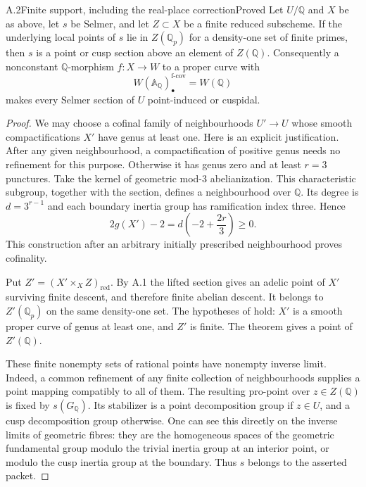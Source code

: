 \begin{statement}{A.2}{Finite support, including the real-place correction}{Proved}
Let $U/\mathbb Q$ and $X$ be as above, let $s$ be Selmer, and let
$Z\subset X$ be a finite reduced subscheme. If the underlying local points
of $s$ lie in $Z(\mathbb Q_p)$ for a density-one set of finite primes, then
$s$ is a point or cusp section above an element of $Z(\mathbb Q)$.
Consequently a nonconstant $\mathbb Q$-morphism $f:X\to W$ to a proper curve
with
\[
 W(\mathbb A_{\mathbb Q})_\bullet^{\mathrm{f\text{-}cov}}=W(\mathbb Q)
\]
makes every Selmer section of $U$ point-induced or cuspidal.
\end{statement}
\begin{proof}
We may choose a cofinal family of neighbourhoods $U'\to U$ whose smooth
compactifications $X'$ have genus at least one. Here is an explicit
justification. After any given neighbourhood, a compactification of positive
genus needs no refinement for this purpose. Otherwise it has genus zero
and at least $r=3$ punctures. Take the kernel of geometric mod-$3$
abelianization. This characteristic subgroup, together with the section,
defines a neighbourhood over $\mathbb Q$. Its degree is $d=3^{r-1}$ and
each boundary inertia group has ramification index three. Hence
\[
 2g(X')-2=d\left(-2+\frac{2r}{3}\right)\geq0.
\]
This construction after an arbitrary initially prescribed neighbourhood
proves cofinality.

Put $Z'=(X'\times_X Z)_{\mathrm{red}}$. By A.1 the lifted section gives
an adelic point of $X'$ surviving finite descent, and therefore finite
abelian descent. It belongs to $Z'(\mathbb Q_p)$ on the same density-one
set. The hypotheses of \citet[Theorem 8.2]{AMStoll2007} hold: $X'$ is a
smooth proper curve of genus at least one, and $Z'$ is finite. The theorem
gives a point of $Z'(\mathbb Q)$.

These finite nonempty sets of rational points have nonempty inverse limit.
Indeed, a common refinement of any finite collection of neighbourhoods
supplies a point mapping compatibly to all of them. The resulting pro-point
over $z\in Z(\mathbb Q)$ is fixed by $s(G_{\mathbb Q})$. Its stabilizer
is a point decomposition group if $z\in U$, and a cusp decomposition group
otherwise. One can see this directly on the inverse limits of geometric
fibres: they are the homogeneous spaces of the geometric fundamental group
modulo the trivial inertia group at an interior point, or modulo the cusp
inertia group at the boundary. Thus $s$ belongs to the asserted packet.


\end{proof}

